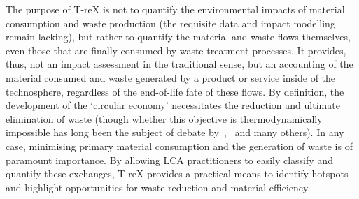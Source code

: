 The purpose of T-reX is not to quantify the environmental impacts of material consumption and waste production (the requisite data and impact modelling remain lacking), but rather to quantify the material and waste flows themselves, even those that are finally consumed by waste treatment processes. It provides, thus, not an impact assessment in the traditional sense, but an accounting of the material consumed and waste generated by a product or service inside of the technosphere, regardless of the end-of-life fate of these flows. By definition, the development of the `circular economy' necessitates the reduction and ultimate elimination of waste (though whether this objective is thermodynamically impossible has long been the subject of debate by~\cite{ayres1998recycling},~\cite{reuter2012recyclinglimits} and many others). In any case, minimising primary material consumption and the generation of waste is of paramount importance. By allowing LCA practitioners to easily classify and quantify these exchanges, T-reX provides a practical means to identify hotspots and highlight opportunities for waste reduction and material efficiency.




